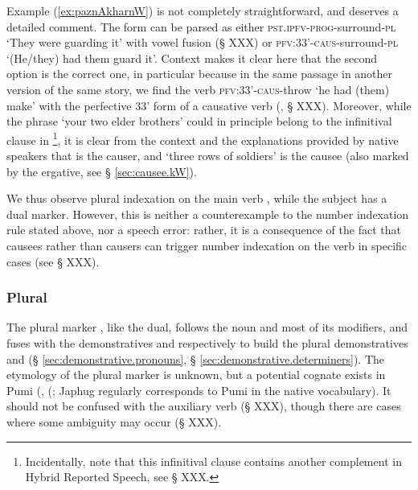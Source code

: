 Example (\ref{ex:paznAkharnW}) is not completely straightforward, and deserves a detailed comment. The form  can be parsed as either  \textsc{pst}.\textsc{ipfv}-\textsc{prog}-surround-\textsc{pl} `They were guarding it' with vowel fusion (§ XXX) or  \textsc{pfv}:3\fl{}3'-\textsc{caus}-surround-\textsc{pl} `(He/they) had them guard it'. Context makes it clear here that the second option is the correct one, in particular because in the same passage in another version of the same story, we find the verb  \textsc{pfv}:3\fl{}3'-\textsc{caus}-throw `he had (them) make' with the perfective 3\fl{}3' form of a causative verb (\citealt[242]{jacques16complementation}, § XXX). Moreover, while the phrase   `your two elder brothers' could in principle belong to the infinitival clause in \footnote{Incidentally, note that this infinitival clause contains another complement in Hybrid Reported Speech, see § XXX.}, it is clear from the context and the explanations provided by native speakers that  is the causer, and  `three rows of soldiers' is the causee (also marked by the ergative, see § \ref{sec:causee.kW}). 

We thus observe plural indexation  on the main verb , while the subject   has a dual marker. However, this is neither a counterexample to the number indexation rule stated above, nor a speech error: rather, it is a consequence of the fact that causees rather than causers can trigger number indexation on the verb in specific cases (see § XXX).

\subsubsection{Plural} \label{sec:plural.determiners}
The plural marker , like the dual, follows the noun and most of its modifiers, and fuses with the demonstratives  and  respectively to build the plural demonstratives  and  (§ \ref{sec:demonstrative.pronouns}, § \ref{sec:demonstrative.determiners}). The etymology of the plural marker  is unknown, but a potential cognate exists in Pumi (, (\citealt[135]{daudey14grammar}; Japhug  regularly corresponds to Pumi  in the native vocabulary). It should not be confused with the auxiliary verb  (§ XXX), though there are cases where some ambiguity may occur (§ XXX).


